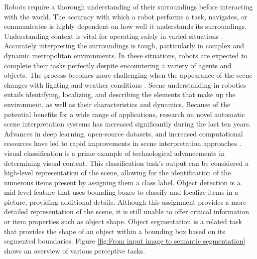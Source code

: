 Robots require a thorough understanding of their surroundings before interacting with the world. The accuracy with which a robot performs a task, navigates, or communicates is highly dependent on how well it understands its surroundings. Understanding context is vital for operating safely in varied situations \cite{premebida2018intelligent}. Accurately interpreting the surroundings is tough, particularly in complex and dynamic metropolitan environments. In these situations, robots are expected to complete their tasks perfectly despite encountering a variety of agents and objects. The process becomes more challenging when the appearance of the scene changes with lighting and weather conditions \cite{valada2020self}. Scene understanding in robotics entails identifying, localizing, and describing the elements that make up the environment, as well as their characteristics and dynamics. Because of the potential benefits for a wide range of applications, research on novel automatic scene interpretation systems has increased significantly during the last ten years. Advances in deep learning, open-source datasets, and increased computational resources have led to rapid improvements in scene interpretation approaches \cite{premebida2018intelligent}. 
visual classification is a prime example of technological advancements in determining visual content. This classification task's output can be considered a high-level representation of the scene, allowing for the identification of the numerous items present by assigning them a class label. Object detection is a mid-level feature that uses bounding boxes to classify and localize items in a picture, providing additional details. Although this assignment provides a more detailed representation of the scene, it is still unable to offer critical information or item properties such as object shape. Object segmentation is a related task that provides the shape of an object within a bounding box based on its segmented boundaries. Figure \ref{fig:From input image to semantic segmentation} shows an overview of various perceptive tasks\cite{hurtado2022semantic}.

